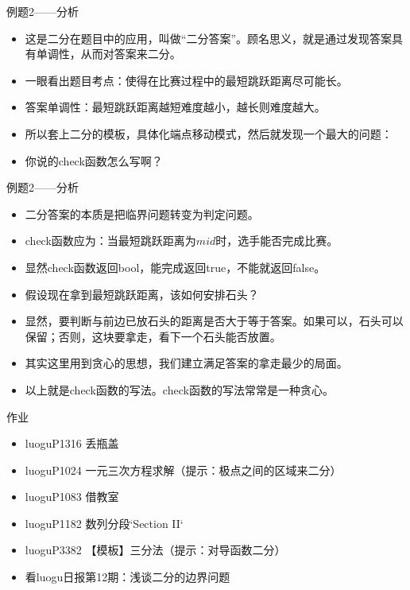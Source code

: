 \documentclass{beamer}[UTF-8]
\begin{document}
\begin{frame}{例题2——分析}
 \pause
\begin{itemize}
\item 这是二分在题目中的应用，叫做“二分答案”。顾名思义，就是通过发现答案具有单调性，从而对答案来二分。 \pause
\item 一眼看出题目考点：使得在比赛过程中的最短跳跃距离尽可能长。 \pause
\item 答案单调性：最短跳跃距离越短难度越小，越长则难度越大。 \pause
\item 所以套上二分的模板，具体化端点移动模式，然后就发现一个最大的问题： \pause
\item 你说的check函数怎么写啊？
\end{itemize}
\end{frame}

\begin{frame}{例题2——分析}
 \pause
\begin{itemize}
\item 二分答案的本质是把临界问题转变为判定问题。 \pause
\item check函数应为：当最短跳跃距离为$mid$时，选手能否完成比赛。 \pause
\item 显然check函数返回bool，能完成返回true，不能就返回false。 \pause
\item 假设现在拿到最短跳跃距离，该如何安排石头？ \pause
\item 显然，要判断与前边已放石头的距离是否大于等于答案。如果可以，石头可以保留；否则，这块要拿走，看下一个石头能否放置。 \pause
\item 其实这里用到贪心的思想，我们建立满足答案的拿走最少的局面。 \pause
\item 以上就是check函数的写法。check函数的写法常常是一种贪心。
\end{itemize}
\end{frame}

\begin{frame}{作业}
 \pause
\begin{itemize}
\item luoguP1316 丢瓶盖
\item luoguP1024 一元三次方程求解（提示：极点之间的区域来二分）
\item luoguP1083 借教室
\item luoguP1182 数列分段`Section II`
\item luoguP3382 【模板】三分法（提示：对导函数二分）
\item 看luogu日报第12期：浅谈二分的边界问题
\end{itemize}
\end{frame}
\end{document}
